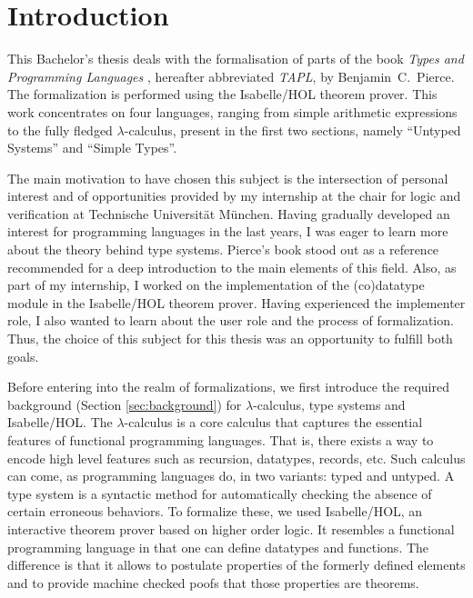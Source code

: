 \section{Introduction}

This Bachelor's thesis deals with the formalisation of parts of the book \emph{Types and Programming
Languages} \cite{pierce-2002-TAPL}, hereafter abbreviated \emph{TAPL}, by Benjamin~C.~Pierce. The
formalization is performed using the Isabelle/HOL theorem prover. This work concentrates on four
languages, ranging from simple arithmetic expressions to the fully fledged $\lambda$-calculus,
present in the first two sections, namely ``Untyped Systems'' and ``Simple Types''.

The main motivation to have chosen this subject is the intersection of personal interest and of
opportunities provided by my internship at the chair for logic and verification at Technische
Universität München. Having gradually developed an interest for programming languages in the last
years, I was eager to learn more about the theory behind type systems. Pierce's book stood out as
a reference recommended for a deep introduction to the main elements of this field. Also, as part of
my internship, I worked on the implementation of the (co)datatype module in the Isabelle/HOL
theorem prover. Having experienced the implementer role, I also wanted to learn about the user
role and the process of formalization. Thus, the choice of this subject for this thesis was an
opportunity to fulfill both goals.

Before entering into the realm of formalizations, we first introduce the required background
(Section \ref{sec:background}) for $\lambda$-calculus, type systems and Isabelle/HOL. The
$\lambda$-calculus is a core calculus that captures the essential features of functional programming
languages.  That is, there exists a way to encode high level features such as recursion, datatypes,
records, etc. Such calculus can come, as programming languages do, in two variants: typed and
untyped. A type system is a syntactic method for automatically checking the absence of certain
erroneous behaviors. To formalize these, we used Isabelle/HOL, an interactive theorem prover based
on higher order logic. It resembles a functional programming language in that one can define
datatypes and functions. The difference is that it allows to postulate properties of the formerly
defined elements and to provide machine checked poofs that those properties are theorems.


